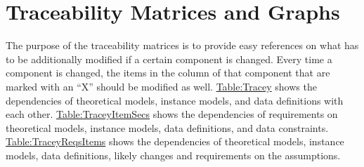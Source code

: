 \documentclass[12pt]{article}
\begin{document}
\section{Traceability Matrices and Graphs}
\label{Sec:TraceMatrices}
The purpose of the traceability matrices is to provide easy references on what has to be additionally modified if a certain component is changed. Every time a component is changed, the items in the column of that component that are marked with an ``X'' should be modified as well. \hyperref[Table:Tracey]{Table:Tracey} shows the dependencies of theoretical models, instance models, and data definitions with each other. \hyperref[Table:TraceyItemSecs]{Table:TraceyItemSecs} shows the dependencies of requirements on theoretical models, instance models, data definitions, and data constraints. \hyperref[Table:TraceyReqsItems]{Table:TraceyReqsItems} shows the dependencies of theoretical models, instance models, data definitions, likely changes and requirements on the assumptions.
\end{document}
